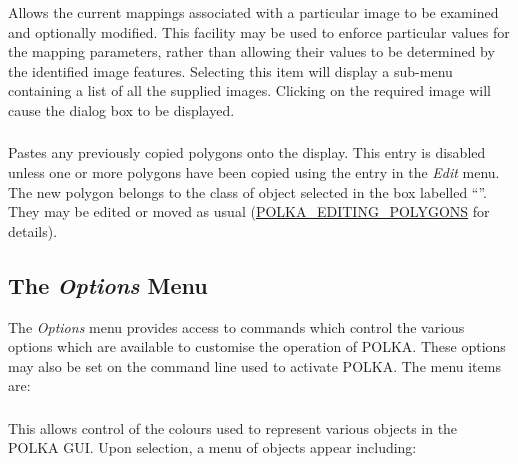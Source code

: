 \subsubsection {} Allows the current
mappings associated with a particular image to be examined and optionally
modified. This facility may be used to enforce particular values for the
mapping parameters, rather than allowing their values to be determined by
the identified image features. Selecting this item will display a
sub-menu containing a list of all the supplied images. Clicking on the
required image will cause the  dialog box to be displayed.

\subsubsection {} Pastes any previously
copied polygons onto the display. This entry is disabled unless one or
more polygons have been copied using the 
entry in the {\em Edit} menu. The new polygon belongs to the class of
object selected in the box labelled ``''. They may be edited or moved as usual
(\hyperref{go here}{see section }{}{POLKA_EDITING_POLYGONS} for details).

\subsection {The {\em Options} Menu}
The {\em Options} menu provides access to commands which control the
various options which are available to customise the operation of POLKA.
These options may also be set on the command line used to activate 
POLKA. The menu items are:

\subsubsection {} 
This allows control of the colours used to represent various objects in
the POLKA GUI. Upon selection, a menu of objects appear including:

